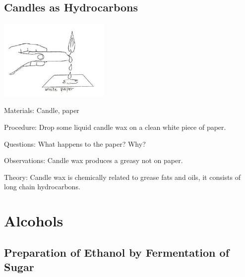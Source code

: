 \begin{multicols}{2}
\vfill
\columnbreak

\subsection{Candles as Hydrocarbons}

\begin{center}
\includegraphics[width=0.4\textwidth]{./img/source/candle-hydrocarbon.jpg}
\end{center}

\begin{description*}
\item[Materials:]{Candle, paper}
\item[Procedure:]{Drop some liquid candle wax on a clean
white piece of paper.}
\item[Questions:]{What happens to the paper? Why?}
\item[Observations:]{Candle wax produces a greasy not on paper.}
\item[Theory:]{Candle wax is chemically related to grease
fats and oils, it consists of long chain
hydrocarbons.}
\end{description*}


\section*{Alcohols}  


\subsection{Preparation of Ethanol by Fermentation of Sugar} 


\end{multicols}
